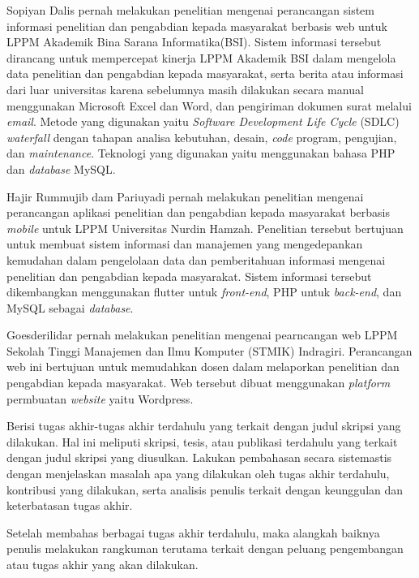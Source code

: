 Sopiyan Dalis pernah melakukan penelitian mengenai perancangan sistem informasi penelitian 
dan pengabdian kepada masyarakat berbasis web untuk LPPM Akademik Bina Sarana Informatika(BSI). 
Sistem informasi tersebut dirancang untuk mempercepat kinerja LPPM Akademik 
BSI dalam mengelola data penelitian dan pengabdian kepada masyarakat, serta 
berita atau informasi dari luar universitas karena sebelumnya masih dilakukan 
secara manual menggunakan Microsoft Excel dan Word, dan pengiriman dokumen surat melalui \textit{email}. 
Metode yang digunakan yaitu \textit{Software Development Life Cycle} (SDLC) \textit{waterfall} 
dengan tahapan analisa kebutuhan, desain, \textit{code} program, pengujian, dan 
\textit{maintenance}. Teknologi yang digunakan yaitu menggunakan bahasa PHP dan 
\textit{database} MySQL\cite{dalis_rancang_2017}. 

Hajir Rummujib dam Pariuyadi pernah melakukan penelitian mengenai perancangan 
aplikasi penelitian dan pengabdian kepada masyarakat berbasis \textit{mobile} 
untuk LPPM Universitas Nurdin Hamzah. Penelitian tersebut bertujuan untuk 
membuat sistem informasi dan manajemen yang mengedepankan kemudahan dalam 
pengelolaan data dan pemberitahuan informasi mengenai penelitian dan pengabdian
kepada masyarakat. Sistem informasi tersebut dikembangkan menggunakan  
flutter untuk \textit{front-end}, PHP untuk \textit{back-end}, dan MySQL sebagai \textit{database}\cite{rummujib_aplikasi_1907}. 

Goesderilidar pernah melakukan penelitian mengenai pearncangan web LPPM Sekolah Tinggi 
Manajemen dan Ilmu Komputer (STMIK) Indragiri. Perancangan web ini bertujuan 
untuk memudahkan dosen dalam melaporkan penelitian dan pengabdian kepada 
masyarakat. Web tersebut dibuat menggunakan \textit{platform} permbuatan 
\textit{website} yaitu Wordpress\cite{__membangun_2021}.


Berisi tugas akhir-tugas akhir terdahulu yang terkait dengan judul skripsi yang dilakukan. Hal ini meliputi skripsi, tesis, atau publikasi terdahulu yang terkait dengan judul skripsi yang diusulkan. Lakukan pembahasan secara sistemastis dengan menjelaskan masalah apa yang dilakukan oleh tugas akhir terdahulu, kontribusi yang dilakukan, serta analisis penulis terkait dengan keunggulan dan keterbatasan tugas akhir. 

Setelah membahas berbagai tugas akhir terdahulu, maka alangkah baiknya penulis melakukan rangkuman terutama terkait dengan peluang pengembangan atau tugas akhir yang akan dilakukan.


